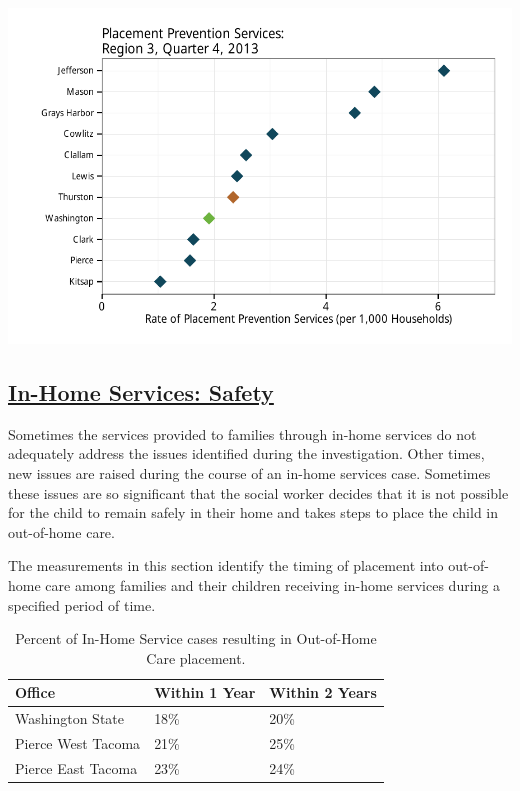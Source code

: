 \documentclass{article}\usepackage{graphicx, color}
\makeatletter
\def\maxwidth{ %
  \ifdim\Gin@nat@width>\linewidth
    \linewidth
  \else
    \Gin@nat@width
  \fi
}
\newenvironment{knitrout}{}{} %
\makeatother
\begin{document}
\begin{knitrout}
\color{fgcolor}

{\centering \includegraphics[width=\maxwidth]{figure/ihs_context} 

}



\end{knitrout}



\subsection{\href{http://www.partnersforourchildren.org/child-well-being/visualizations/home-services/safety}
    {In-Home Services: Safety}
}
Sometimes the services provided to families through in-home services do not adequately address the issues identified during the investigation. Other times, new issues are raised during the course of an in-home services case. Sometimes these issues are so significant that the social worker decides that it is not possible for the child to remain safely in their home and takes steps to place the child in out-of-home care.

The measurements in this section identify the timing of placement into out-of-home care among families and their children receiving in-home services during a specified period of time.

\begin{table}[ht]
\centering
\caption{Percent of In-Home Service cases resulting in Out-of-Home Care placement.} 
\begin{tabular}{lll}
  \toprule
Office & Within 1 Year & Within 2 Years \\ 
  \midrule
Washington State & 18\% & 20\% \\ 
  Pierce West Tacoma & 21\% & 25\% \\ 
  Pierce East Tacoma & 23\% & 24\% \\ 
   \bottomrule
\end{tabular}
\end{table}
\end{document}
